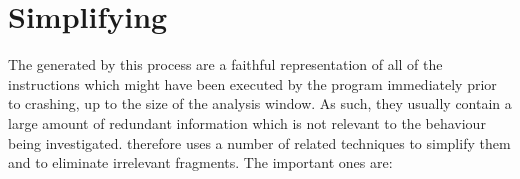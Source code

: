 
\section{Simplifying {\StateMachines}}

The {\StateMachines} generated by this process are a faithful
representation of all of the instructions which might have been
executed by the program immediately prior to crashing, up to the size
of the analysis window.  As such, they usually contain a large amount
of redundant information which is not relevant to the behaviour being
investigated.  {\Technique} therefore uses a number of related
techniques to simplify them and to eliminate irrelevant fragments.
The important ones are:

